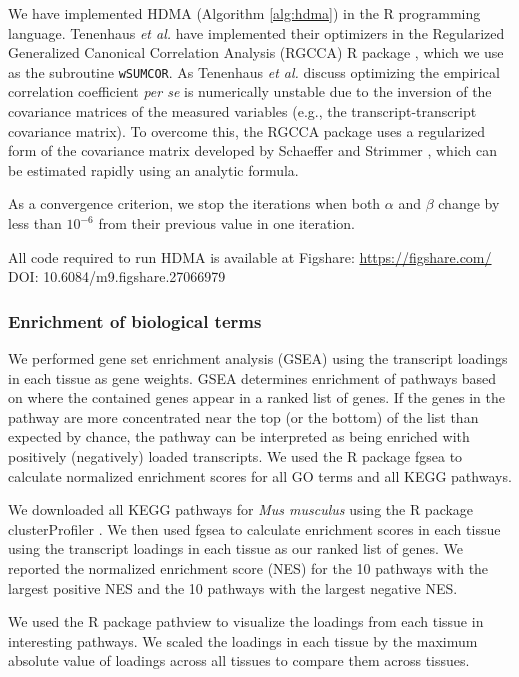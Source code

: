 \documentclass[
]{article}
\begin{document}
We have implemented HDMA (Algorithm \ref{alg:hdma}) in the R programming
language. Tenenhaus \textit{et al.} have implemented their optimizers in
the Regularized Generalized Canonical Correlation Analysis (RGCCA) R
package \cite{girka2023multiblock}, which we use as the subroutine
\texttt{wSUMCOR}. As Tenenhaus \textit{et al.} discuss optimizing the
empirical correlation coefficient \textit{per se} is numerically
unstable due to the inversion of the covariance matrices of the measured
variables (e.g., the transcript-transcript covariance matrix). To
overcome this, the RGCCA package uses a regularized form of the
covariance matrix developed by Schaeffer and Strimmer
\cite{schafer2005shrinkage}, which can be estimated rapidly using an
analytic formula.

As a convergence criterion, we stop the iterations when both \(\alpha\)
and \(\beta\) change by less than \(10^{-6}\) from their previous value
in one iteration.

All code required to run HDMA is available at Figshare:
\url{https://figshare.com/} DOI: 10.6084/m9.figshare.27066979
\cite{DO_data}

\subsubsection{Enrichment of biological
terms}\label{enrichment-of-biological-terms}

We performed gene set enrichment analysis (GSEA) \cite{pmid16199517}
using the transcript loadings in each tissue as gene weights. GSEA
determines enrichment of pathways based on where the contained genes
appear in a ranked list of genes. If the genes in the pathway are more
concentrated near the top (or the bottom) of the list than expected by
chance, the pathway can be interpreted as being enriched with positively
(negatively) loaded transcripts. We used the R package fgsea
\cite{fgsea} to calculate normalized enrichment scores for all GO terms
and all KEGG pathways.

We downloaded all KEGG \cite{pmid36300620} pathways for
\textit{Mus musculus} using the R package clusterProfiler
\cite{pmid36300620}. We then used fgsea to calculate enrichment scores
in each tissue using the transcript loadings in each tissue as our
ranked list of genes. We reported the normalized enrichment score (NES)
for the 10 pathways with the largest positive NES and the 10 pathways
with the largest negative NES.

We used the R package pathview \cite{pmid23740750} to visualize the
loadings from each tissue in interesting pathways. We scaled the
loadings in each tissue by the maximum absolute value of loadings across
all tissues to compare them across tissues.
\end{document}

